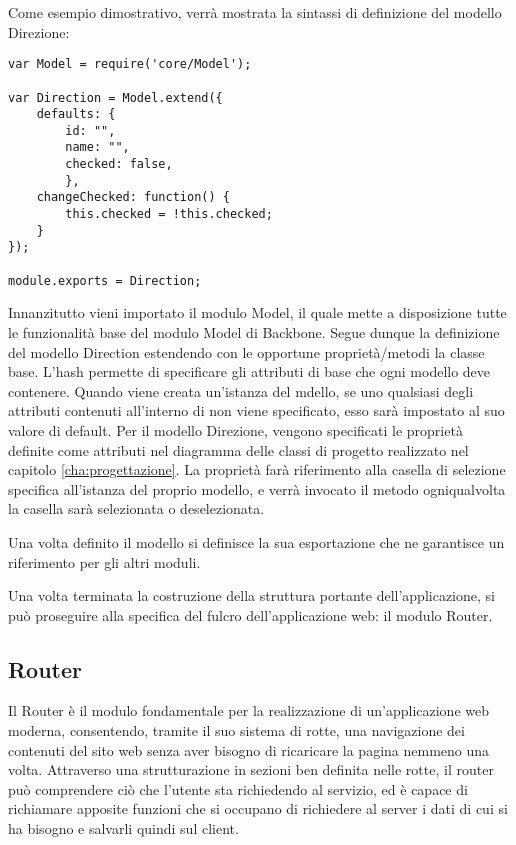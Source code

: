 Come esempio dimostrativo, verrà mostrata la sintassi di definizione del modello Direzione:

\begin{lstlisting}
var Model = require('core/Model');

var Direction = Model.extend({
    defaults: {
        id: "",
        name: "",
        checked: false,
        },
    changeChecked: function() {
        this.checked = !this.checked;
    }
});

module.exports = Direction;
\end{lstlisting}

Innanzitutto vieni importato il modulo Model, il quale mette a disposizione tutte le funzionalità base del modulo Model di Backbone.
Segue dunque la definizione del modello Direction estendendo con le opportune proprietà/metodi la classe base.
L'hash  permette di specificare gli attributi di base che ogni modello deve contenere. Quando viene creata un'istanza del mdello, se uno qualsiasi degli attributi contenuti all'interno di  non viene specificato, esso sarà impostato al suo valore di default.
Per il modello Direzione, vengono specificati le proprietà definite come attributi nel diagramma delle classi di progetto realizzato nel capitolo \ref{cha:progettazione}. La proprietà  farà riferimento alla casella di selezione specifica all'istanza del proprio modello, e verrà invocato il metodo  ogniqualvolta la casella sarà selezionata o deselezionata.

Una volta definito il modello si definisce la sua esportazione che ne garantisce un riferimento per gli altri moduli.

Una volta terminata la costruzione della struttura portante dell'applicazione, si può proseguire alla specifica del fulcro dell'applicazione web: il modulo Router.
\newpage

\subsection{Router} %
\label{sub:router}

Il Router è il modulo fondamentale per la realizzazione di un'applicazione web moderna, consentendo, tramite il suo sistema di rotte, una navigazione dei contenuti del sito web senza aver bisogno di ricaricare la pagina nemmeno una volta.
Attraverso una strutturazione in sezioni ben definita nelle rotte, il router può comprendere ciò che l'utente sta richiedendo al servizio, ed è capace di richiamare apposite funzioni che si occupano di richiedere al server i dati di cui si ha bisogno e salvarli quindi sul client.

